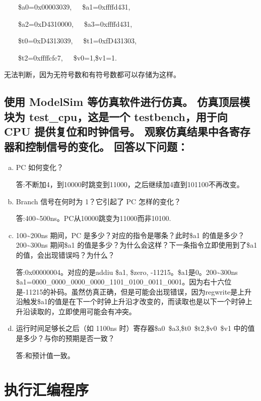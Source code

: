 \documentclass{ctexart}
\begin{document}
         ~~~~\$a0=0x00003039,~~~\$a1=0xffffd431,

         ~~~~\$a2=0xD4310000,~~~\$a3=0xffffd431,

         ~~~~\$t0=0xD4313039,~~~\$t1=0xfD431303,

         ~~~~\$t2=0xffffcfc7,~~~\$v0=1,\$v1=1.

         无法判断，因为无符号数和有符号数都可以存储为这样。

         \subsection  { 使用 ModelSim 等仿真软件进行仿真。 仿真顶层模块为 test\_cpu，这是一个 testbench，用于向 CPU 提供复位和时钟信号。 观察仿真结果中各寄存器和控制信号的变化。 回答以下问题：}
         \begin{enumerate}[a)] 
             \item{ PC 如何变化？}

                 答:不断加4，到10000时跳变到11000，之后继续加4直到101100不再改变。

             \item{Branch 信号在何时为 1？它引起了 PC 怎样的变化？}

                 答:400\~{}500ns。PC从10000跳变为11000而非10100.

             \item{100\~{}200ns 期间，PC 是多少？对应的指令是哪条？此时\$a1 的值是多少？200\~{}300ns 期间\$a1 的值是多少？为什么会这样？下一条指令立即使用到了\$a1 的值，会出现错误吗？为什么？}

                 答:0x00000004。对应的是addiu \$a1, \$zero, -11215。\$a1是0。200\~{}300ns
                 \$a1=0000\_0000\_0000\_0000\_1101\_0100\_0011\_0001。因为右十六位是-11215的补码。虽然仿真正确，但是可能会出现错误，因为regwrite是上升沿触发\$a1的值是在下一个时钟上升沿才改变的，而读取也是以下一个时钟上升沿读取的，立即使用可能会有冲突。

             \item{运行时间足够长之后（如 1100ns 时）寄存器\$a0~\$a3,\$t0~\$t2,\$v0~\$v1 中的值是多少？与你的预期是否一致？}

                 答:和预计值一致。
         \end{enumerate}
         \section{执行汇编程序}
\end{document}
